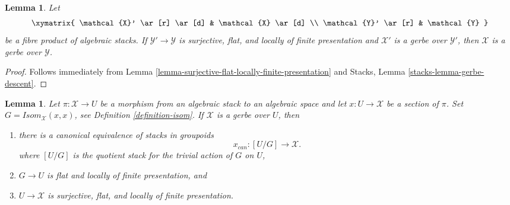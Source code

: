 \documentclass{stacks-project}
\theoremstyle{plain}
\newtheorem{lemma}[subsection]{Lemma}
\theoremstyle{definition}
\theoremstyle{remark}
\numberwithin{equation}{subsection}
\begin{document}
\begin{lemma}
\label{lemma-gerbe-descent}
Let
$$
\xymatrix{
\mathcal{X}' \ar[r] \ar[d] & \mathcal{X} \ar[d] \\
\mathcal{Y}' \ar[r] & \mathcal{Y}
}
$$
be a fibre product of algebraic stacks.
If $\mathcal{Y}' \to \mathcal{Y}$ is surjective, flat, and locally
of finite presentation and $\mathcal{X}'$ is a gerbe over $\mathcal{Y}'$,
then $\mathcal{X}$ is a gerbe over $\mathcal{Y}$.
\end{lemma}

\begin{proof}
Follows immediately from
Lemma \ref{lemma-surjective-flat-locally-finite-presentation}
and
Stacks, Lemma \ref{stacks-lemma-gerbe-descent}.
\end{proof}

\begin{lemma}
\label{lemma-gerbe-with-section}
Let $\pi : \mathcal{X} \to U$ be a morphism from an algebraic stack to
an algebraic space and let $x : U \to \mathcal{X}$ be a section of $\pi$.
Set $G = \mathit{Isom}_\mathcal{X}(x, x)$, see
Definition \ref{definition-isom}.
If $\mathcal{X}$ is a gerbe over $U$, then
\begin{enumerate}
\item there is a canonical equivalence of stacks in groupoids
$$
x_{can} : [U/G] \longrightarrow \mathcal{X}.
$$
where $[U/G]$ is the quotient stack for the trivial
action of $G$ on $U$,
\item $G \to U$ is flat and locally of finite presentation, and
\item $U \to \mathcal{X}$ is surjective, flat, and locally of finite
presentation.
\end{enumerate}
\end{lemma}
\end{document}
